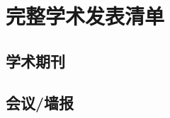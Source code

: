 \documentclass{resume}
\begin{document}
\nocite{*} %
\section{完整学术发表清单}
\subsection{学术期刊}
\begin{refsection}[paper]
  \nocite{*}
  \printbibliography[heading=none, title={ }]
\end{refsection}

\subsection{会议/墙报}
\begin{refsection}[conference]
  \nocite{*}
  \printbibliography[heading=none, title={ }]
\end{refsection}

\end{document}
